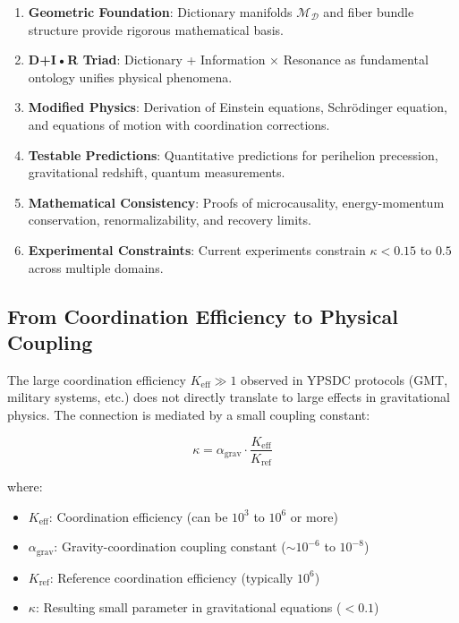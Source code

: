 \documentclass[11pt,a4paper]{article}
\begin{document}
	\begin{enumerate}
		\item \textbf{Geometric Foundation}: Dictionary manifolds $\mathcal{M}_{\mathcal{D}}$ and fiber bundle structure provide rigorous mathematical basis.
		
		\item \textbf{D+I•R Triad}: Dictionary + Information × Resonance as fundamental ontology unifies physical phenomena.
		
		\item \textbf{Modified Physics}: Derivation of Einstein equations, Schrödinger equation, and equations of motion with coordination corrections.
		
		\item \textbf{Testable Predictions}: Quantitative predictions for perihelion precession, gravitational redshift, quantum measurements.
		
		\item \textbf{Mathematical Consistency}: Proofs of microcausality, energy-momentum conservation, renormalizability, and recovery limits.
		
		\item \textbf{Experimental Constraints}: Current experiments constrain $\kappa < 0.15$ to $0.5$ across multiple domains.
	\end{enumerate}
	

\subsection{From Coordination Efficiency to Physical Coupling}
\label{subsec:keff-to-coupling}

The large coordination efficiency $K_{\mathrm{eff}} \gg 1$ observed in YPSDC protocols (GMT, military systems, etc.) does not directly translate to large effects in gravitational physics. The connection is mediated by a small coupling constant:

\begin{equation}
	\kappa = \alpha_{\text{grav}} \cdot \frac{K_{\mathrm{eff}}}{K_{\text{ref}}}
\end{equation}

where:
\begin{itemize}
	\item $K_{\mathrm{eff}}$: Coordination efficiency (can be $10^3$ to $10^6$ or more)
	\item $\alpha_{\text{grav}}$: Gravity-coordination coupling constant ($\sim 10^{-6}$ to $10^{-8}$)
	\item $K_{\text{ref}}$: Reference coordination efficiency (typically $10^6$)
	\item $\kappa$: Resulting small parameter in gravitational equations ($< 0.1$)
\end{itemize}
\end{document}
